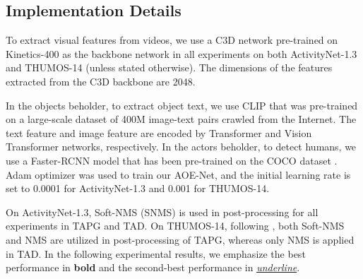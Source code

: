 \documentclass[sn-mathphys]{sn-jnl}
\theoremstyle{thmstyleone}\newtheorem{theorem}{Theorem}\newtheorem{proposition}[theorem]{Proposition}
\theoremstyle{thmstyletwo}\newtheorem{example}{Example}\newtheorem{remark}{Remark}
\theoremstyle{thmstylethree}\newtheorem{definition}{Definition}
\begin{document}
\subsection{Implementation Details}

To extract visual features from videos, we use a C3D \cite{C3D} network pre-trained on Kinetics-400 \cite{Kinetics} as the backbone network in all experiments on both ActivityNet-1.3 \cite{caba2015activitynet} and THUMOS-14 \cite{THUMOS14} (unless stated otherwise). The dimensions of the features extracted from the C3D backbone are 2048. 

In the objects beholder, to extract object text, we use CLIP \cite{radford2021learning} that was pre-trained on a large-scale dataset of 400M image-text pairs crawled from the Internet. The text feature and image feature are encoded by Transformer \cite{attention_is_all_you_need} and Vision Transformer \cite{dosovitskiy2020image} networks, respectively. In the actors beholder, to detect humans, we use a Faster-RCNN model \cite{FasterRCNN} that has been pre-trained on the COCO dataset \cite{cocodataset}. Adam optimizer was used to train our AOE-Net, and the initial learning rate is set to 0.0001 for ActivityNet-1.3 and 0.001 for THUMOS-14.

On ActivityNet-1.3, Soft-NMS (SNMS) \cite{SoftNMS} is used in post-processing for all experiments in TAPG and TAD. On THUMOS-14, following \cite{lin2018bsn, bmn}, both Soft-NMS \cite{SoftNMS} and NMS \cite{NMS} are utilized in post-processing of TAPG, whereas only NMS is applied in TAD. In the following experimental results, we emphasize the best performance in \textbf{bold} and the second-best performance in \underline{\textit{underline}}.
\end{document}
